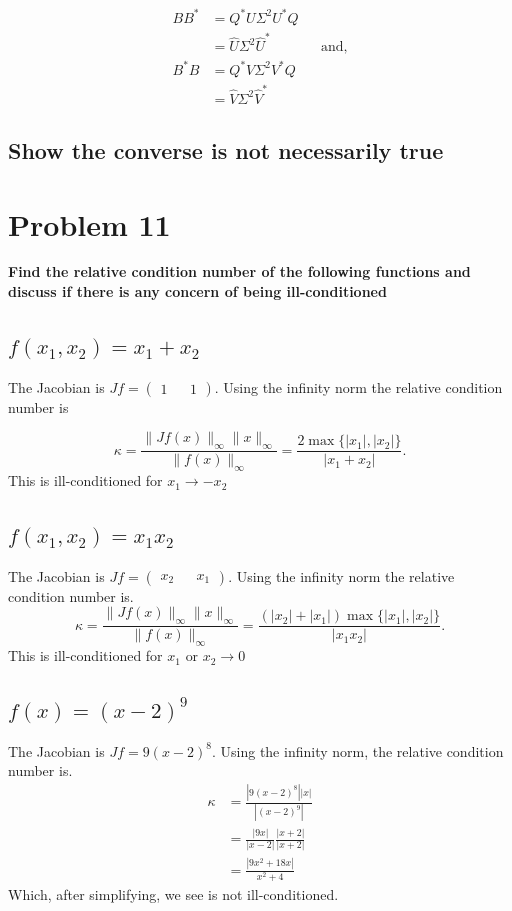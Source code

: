   \begin{align*}
    BB^* &= Q^*U\Sigma^2U^*Q \\
         &= \hat U\Sigma^2\hat U^* && \text{and,} \\
    B^*B &= Q^*V\Sigma^2V^*Q \\
         &= \hat V\Sigma^2\hat V^*
  \end{align*}

\subsection{Show the converse is not necessarily true}%
\label{sub:10.2}

\section{Problem 11}%
\label{sec:problem_11}

\textbf{Find the relative condition number of the following functions and discuss if there is any concern of being ill-conditioned} 

\subsection{$f (x_1,x_2) = x_1 + x_2$}%
\label{sub:11.1}

The Jacobian is  $Jf= \begin{pmatrix} 1 && 1 \end{pmatrix}$. Using the infinity norm the relative condition number is

\[
  \kappa = \frac{\|Jf(x)\|_\infty\|x\|_\infty}{\|f(x)\|_\infty}
= \frac{2\max{\{|x_1|,|x_2|\}}}{|x_1+x_2|}
.\] 
This is ill-conditioned for $x_1\longrightarrow -x_2$

\subsection{$f (x_1,x_2) = x_1 x_2$}%
\label{sub:11.2}

The Jacobian is  $Jf= \left(\begin{matrix} x_2 && x_1 \end{matrix}
\right)$. Using the infinity norm the relative condition number is.
\[
  \kappa = \frac{\|Jf(x)\|_\infty\|x\|_\infty}{\|f(x)\|_\infty}
= \frac{ \left(|x_2|+|x_1|\right)\max{\{|x_1|,|x_2|\}}}{|x_1x_2|}
.\] 
This is ill-conditioned for $x_1\text{ or } x_2\longrightarrow 0$

\subsection{$f (x) = (x-2)^{9}$}%
\label{sub:11.2}
The Jacobian is  $Jf=9(x-2)^8$. Using the
          infinity norm, the relative condition number is.
          \begin{align*}
            \kappa &= \frac{|9(x-2)^8||x|}{|(x-2)^9|} \\
                   &= \frac{|9x|}{|x-2|} \frac{|x+2|}{|x+2|} \\
                   & = \frac{|9x^2+ 18x|}{x^2+4}
          \end{align*}
Which, after simplifying, we see is not ill-conditioned.

